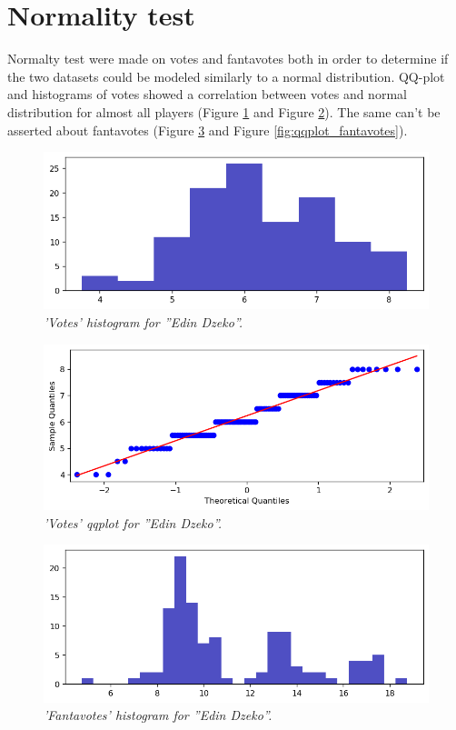 \section{Normality test}

Normalty test were made on votes and fantavotes both in order to determine if the two datasets could be modeled similarly to a normal distribution.
QQ-plot and histograms of votes showed a correlation between votes and normal distribution for almost all players (Figure \ref{fig:hist_votes} and Figure \ref{fig:qqplot_votes}).
The same can't be asserted about fantavotes (Figure \ref{fig:hist_fantavotes} and Figure \ref{fig:qqplot_fantavotes}).

\begin{figure}[H]
  \includegraphics[scale=0.5]{images/dzeko_normality_test_voti_barchart.png}
    \centering  
   \caption{\textit{'Votes' histogram for ''Edin Dzeko''.}}
  \label{fig:hist_votes}
\end{figure}

\begin{figure}[H]
  \includegraphics[scale=0.5]{images/dzeko_normality_test_voti_qqplot.png}
   \centering  
   \caption{\textit{'Votes' qqplot for ''Edin Dzeko''.}}
  \label{fig:qqplot_votes}
\end{figure}

\begin{figure}[H]
  \includegraphics[scale=0.5]{images/dzeko_normality_test_fantavoti_barchart.png}
   \centering  
   \caption{\textit{'Fantavotes' histogram for ''Edin Dzeko''.}}
  \label{fig:hist_fantavotes}
\end{figure}

